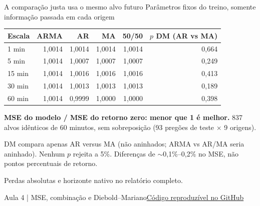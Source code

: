 \documentclass[aspectratio=169,10pt]{beamer}
\newcommand{\source}[2]{\par\vfill{\raggedright\tiny\color{muted}#1\quad\href{#2}{Código reproduzível no GitHub}\par}}
\newcommand{\tagline}[1]{{\small\color{teal}#1}\par\medskip}
\begin{document}
\begin{frame}[t]{A comparação justa usa o mesmo alvo futuro}
\tagline{Parâmetros fixos do treino, somente informação passada em cada origem}
\centering\small\begin{tabular}{lrrrrr}
\toprule
Escala & ARMA & AR & MA & 50/50 & $p$ DM (AR vs MA) \\ \midrule
1 min & 1,0014 & 1,0014 & 1,0014 & 1,0014 & 0,664 \\
5 min & 1,0014 & 1,0007 & 1,0007 & 1,0007 & 0,249 \\
15 min & 1,0014 & 1,0016 & 1,0016 & 1,0016 & 0,413 \\
30 min & 1,0014 & 1,0013 & 1,0013 & 1,0013 & 0,189 \\
60 min & 1,0014 & 0,9999\phantom{9} & 1,0000\phantom{9} & 1,0000\phantom{9} & 0,398 \\
\bottomrule
\end{tabular}\par
\raggedright\medskip\small \textbf{MSE do modelo / MSE do retorno zero: menor que 1 é melhor.} 837 alvos idênticos de 60 minutos, sem sobreposição (93 pregões de teste $\times$ 9 origens).\par
\scriptsize DM compara apenas AR versus MA (não aninhados; ARMA vs AR/MA seria aninhado). Nenhum $p$ rejeita a 5\%. Diferenças de $\sim$0,1\%--0,2\% no MSE, não pontos percentuais de retorno.\par Perdas absolutas e horizonte nativo no relatório completo.
\source{Aula 4 | MSE, combinação e Diebold--Mariano}{https://github.com/avilarenan/EAD6034/blob/main/src/ead6034/forecast_evaluation.py}
\end{frame}
\end{document}
